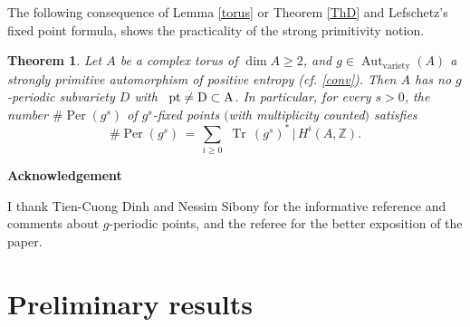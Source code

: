 \documentclass[11pt,a4paper,psamsfonts]{amsart}
\theoremstyle{plain}
\newtheorem{theorem}[thm]{Theorem}
\theoremstyle{definition}
\theoremstyle{remark}
\begin{document}
The following consequence of Lemma \ref{torus} or Theorem \ref{ThD}
and Lefschetz's fixed point formula,
shows the practicality of the strong primitivity notion.

\begin{theorem}
Let $A$ be a complex torus of $\dim A \ge 2$,
and $g \in {\operatorname{Aut}}_{\operatorname{variety}}(A)$ a strongly primitive automorphism of positive
entropy {\rm (cf. \ref{conv})}. Then $A$ has no $g$-periodic subvariety $D$ with
\ $\rm{pt} \ne D \subset A$.
In particular, for every $s > 0$, the number $\#{\operatorname{Per}}(g^s)$ of
$g^s$-fixed points $($with multiplicity counted$)$ satisfies
$$\#{\operatorname{Per}}(g^s) \, = \, \sum_{i \ge 0} \,\, {\operatorname{Tr}} \, (g^s)^* \, | \, H^i(A, {\mathbb{Z}}).$$
\end{theorem}

\par \noindent
{\bf Acknowledgement}

I thank Tien-Cuong Dinh and Nessim Sibony for the informative reference \cite{DS08} and comments
about $g$-periodic points, and the referee for the better exposition of the paper.

\section{Preliminary results}
\end{document}
